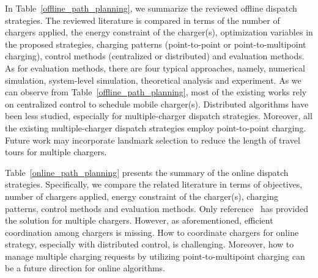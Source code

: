 \documentclass[twocolumn,10pt]{IEEEtran}
\begin{document}
In Table~\ref{offline_path_planning}, we summarize the reviewed offline dispatch strategies. The reviewed literature is compared in terms of the number of chargers applied, the energy constraint of the charger(s), optimization variables in the proposed strategies, charging patterns (point-to-point or point-to-multipoint charging), control methods (centralized or distributed) and evaluation methods. As for evaluation methods, there are four typical approaches, namely, numerical simulation, system-level simulation, theoretical analysis and experiment. As we can observe from Table~\ref{offline_path_planning}, most of the existing works rely on centralized control to schedule mobile charger(s). Distributed algorithms have been less studied, especially for multiple-charger dispatch strategies. Moreover, all the existing multiple-charger dispatch strategies employ point-to-point charging. Future work may incorporate landmark selection to reduce the length of travel tours for multiple chargers. 

Table~\ref{online_path_planning} presents the summary of the online dispatch strategies. Specifically, we compare the related literature in terms of objectives, number of chargers applied, energy constraint of the charger(s), charging patterns, control methods and evaluation methods. 
Only reference~\cite{L.2014Jiang} has provided the solution for multiple chargers. However, as aforementioned, efficient coordination among chargers is missing. How to coordinate chargers for online strategy, especially with distributed control, is challenging. Moreover, how to manage multiple charging requests by utilizing point-to-multipoint charging can be a future direction for online algorithms.   
\end{document}
